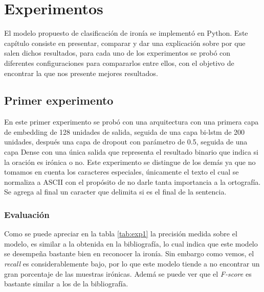 \chapter{Experimentos}\label{cap.experimentos}


\par El modelo propuesto de clasificación de ironía se implementó en Python. Este capítulo consiste en presentar, comparar y dar una explicación sobre por que salen dichos resultados, para cada uno de los experimentos se probó con diferentes configuraciones para compararlos entre ellos, con el objetivo de encontrar la que nos presente mejores resultados.

\section{Primer experimento}

\par En este primer experimento se probó con una arquitectura con una primera capa de embedding de 128 unidades de salida, seguida de una capa \gls{bi-lstm} de 200 unidades, después una capa de dropout con parámetro de 0.5, seguida de una capa Dense con una única salida que representa el resultado binario que indica si la oración es irónica o no. Este experimento se distingue de los demás ya que no tomamos en cuenta los caracteres especiales, únicamente el texto el cual se normaliza a ASCII con el propósito de no darle tanta importancia a la ortografía. Se agrega al final un caracter que delimita si es el final de la sentencia.

\subsection{Evaluación}
\begin{center}
	
\end{center}

\par Como se puede apreciar en la tabla \ref{tab:exp1} la precisión medida sobre el modelo, es similar a la obtenida en la bibliografía, lo cual indica que este modelo se desempeña bastante bien en reconocer la ironía. Sin embargo como vemos, el \textit{recall} es considerablemente bajo, por lo que este modelo tiende a no encontrar un gran porcentaje de las muestras irónicas. Ademá se puede ver que el \textit{F-score} es bastante similar a los de la bibliografía.

